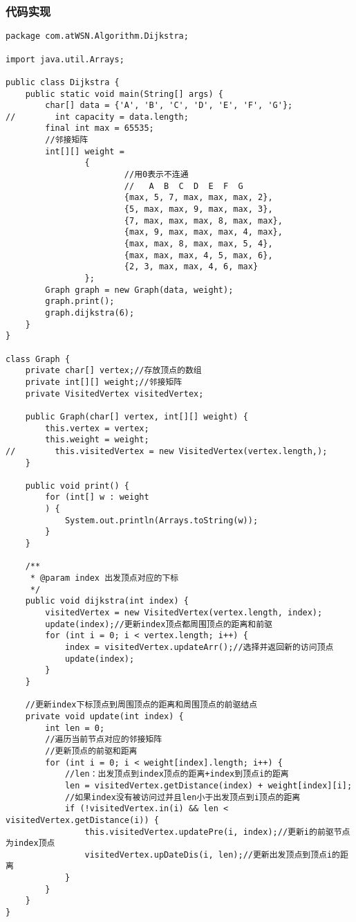 \documentclass[a4paper]{report}
\begin{document}
\subsubsection{代码实现}
\begin{lstlisting}
package com.atWSN.Algorithm.Dijkstra;

import java.util.Arrays;

public class Dijkstra {
    public static void main(String[] args) {
        char[] data = {'A', 'B', 'C', 'D', 'E', 'F', 'G'};
//        int capacity = data.length;
        final int max = 65535;
        //邻接矩阵
        int[][] weight =
                {
                        //用0表示不连通
                        //   A  B  C  D  E  F  G
                        {max, 5, 7, max, max, max, 2},
                        {5, max, max, 9, max, max, 3},
                        {7, max, max, max, 8, max, max},
                        {max, 9, max, max, max, 4, max},
                        {max, max, 8, max, max, 5, 4},
                        {max, max, max, 4, 5, max, 6},
                        {2, 3, max, max, 4, 6, max}
                };
        Graph graph = new Graph(data, weight);
        graph.print();
        graph.dijkstra(6);
    }
}

class Graph {
    private char[] vertex;//存放顶点的数组
    private int[][] weight;//邻接矩阵
    private VisitedVertex visitedVertex;

    public Graph(char[] vertex, int[][] weight) {
        this.vertex = vertex;
        this.weight = weight;
//        this.visitedVertex = new VisitedVertex(vertex.length,);
    }

    public void print() {
        for (int[] w : weight
        ) {
            System.out.println(Arrays.toString(w));
        }
    }

    /**
     * @param index 出发顶点对应的下标
     */
    public void dijkstra(int index) {
        visitedVertex = new VisitedVertex(vertex.length, index);
        update(index);//更新index顶点都周围顶点的距离和前驱
        for (int i = 0; i < vertex.length; i++) {
            index = visitedVertex.updateArr();//选择并返回新的访问顶点
            update(index);
        }
    }

    //更新index下标顶点到周围顶点的距离和周围顶点的前驱结点
    private void update(int index) {
        int len = 0;
        //遍历当前节点对应的邻接矩阵
        //更新顶点的前驱和距离
        for (int i = 0; i < weight[index].length; i++) {
            //len：出发顶点到index顶点的距离+index到顶点i的距离
            len = visitedVertex.getDistance(index) + weight[index][i];
            //如果index没有被访问过并且len小于出发顶点到i顶点的距离
            if (!visitedVertex.in(i) && len < visitedVertex.getDistance(i)) {
                this.visitedVertex.updatePre(i, index);//更新i的前驱节点为index顶点
                visitedVertex.upDateDis(i, len);//更新出发顶点到顶点i的距离
            }
        }
    }
}


\end{lstlisting}
\end{document}
